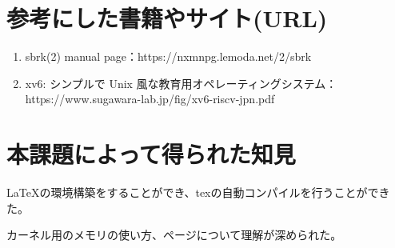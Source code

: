 \documentclass[a4j,12pt]{jreport}
\begin{document}
\section{参考にした書籍やサイト(URL)}
\begin{enumerate}
      \item sbrk(2) manual page：https://nxmnpg.lemoda.net/2/sbrk
      \item xv6: シンプルで Unix 風な教育用オペレーティングシステム：https://www.sugawara-lab.jp/fig/xv6-riscv-jpn.pdf
\end{enumerate}


\section{本課題によって得られた知見}
\LaTeX の環境構築をすることができ、texの自動コンパイルを行うことができた。

カーネル用のメモリの使い方、ページについて理解が深められた。
\end{document}
